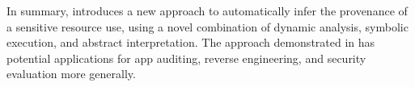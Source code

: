 In summary, \hogarth{} introduces a new approach to automatically
infer the provenance of a sensitive resource use, using a novel
combination of dynamic analysis, symbolic execution, and abstract
interpretation. The approach demonstrated in \hogarth{} has potential
applications for app auditing, reverse engineering, and security
evaluation more generally.



